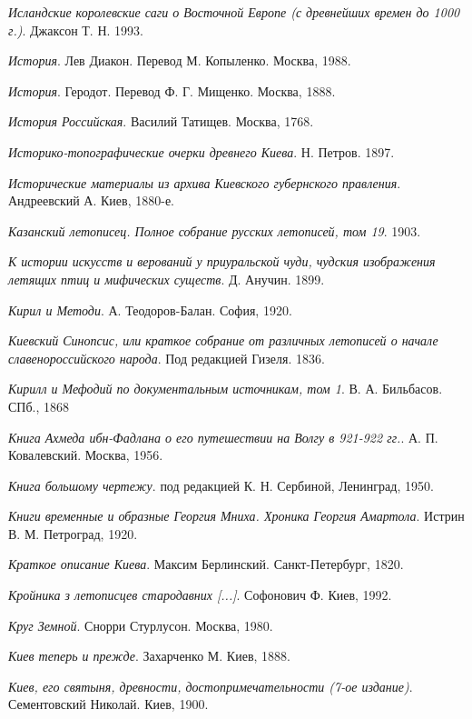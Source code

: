 \emph{Исландские королевские саги о Восточной Европе (с древнейших времен до 1000 г.)}. Джаксон Т. Н. 1993.

\emph{История}. Лев Диакон. Перевод М. Копыленко. Москва, 1988.

\emph{История}. Геродот. Перевод Ф. Г. Мищенко. Москва, 1888.

\emph{История Российская}. Василий Татищев. Москва, 1768.

\emph{Историко-топографические очерки древнего Киева}. Н. Петров. 1897.

\emph{Исторические материалы из архива Киевского губернского правления}. Андреевский А. Киев, 1880-е.

\emph{Казанский летописец. Полное собрание русских летописей, том 19}. 1903.

\emph{К истории искусств и верований у приуральской чуди, чудския изображения летящих птиц и мифических существ}. Д. Анучин. 1899.

\emph{Кирил и Методи}. А. Теодоров-Балан. София, 1920.

\emph{Киевский Синопсис, или краткое собрание от различных летописей о начале славенороссийского народа}. Под редакцией Гизеля. 1836.

\emph{Кирилл и Мефодий по документальным источникам, том 1}. В. А. Бильбасов. СПб., 1868 

\emph{Книга Ахмеда ибн-Фадлана о его путешествии на Волгу в 921-922 гг.}. А. П. Ковалевский. Москва, 1956.

\emph{Книга большому чертежу}. под редакцией К. Н. Сербиной, Ленинград, 1950.

\emph{Книги временные и образные Георгия Мниха. Хроника Георгия Амартола}. Истрин В. М. Петроград, 1920.

\emph{Краткое описание Киева}. Максим Берлинский. Санкт-Петербург, 1820.

\emph{Кройника з летописцев стародавних [...]}. Софонович Ф. Киев, 1992.

\emph{Круг Земной}. Снорри Стурлусон. Москва, 1980.

\emph{Киев теперь и прежде}. Захарченко М. Киев, 1888.

\emph{Киев, его святыня, древности, достопримечательности (7-ое издание)}. Сементовский Николай. Киев, 1900.

